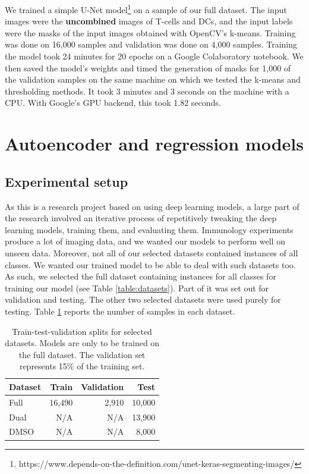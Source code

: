 We trained a simple U-Net model\footnote{https://www.depends-on-the-definition.com/unet-keras-segmenting-images/} on a sample of our full dataset. The input images were the \textbf{uncombined} images of T-cells and DCs, and the input labels were the masks of the input images obtained with OpenCV's k-means. Training was done on 16,000 samples and validation was done on 4,000 samples. Training the model took 24 minutes for 20 epochs on a Google Colaboratory notebook. We then saved the model's weights and timed the generation of masks for 1,000 of the validation samples on the same machine on which we tested the k-means and thresholding methods. It took 3 minutes and 3 seconds on the machine with a CPU. With Google's GPU backend, this took 1.82 seconds.

\section{Autoencoder and regression models}

\subsection{Experimental setup}

As this is a research project based on using deep learning models, a large part of the research involved an iterative process of repetitively tweaking the deep learning models, training them, and evaluating them. Immunology experiments produce a lot of imaging data, and we wanted our models to perform well on unseen data. Moreover, not all of our selected datasets contained instances of all classes. We wanted our trained model to be able to deal with such datasets too. As such, we selected the full dataset containing instances for all classes for training our model (see Table \ref{table:datasets}). Part of it was set out for validation and testing. The other two selected datasets were used purely for testing. Table \ref{table:splits} reports the number of samples in each dataset.

\begin{table}[h]
\centering
\caption{Train-test-validation splits for selected datasets. Models are only to be trained on the full dataset. The validation set represents 15\% of the training set.}
\begin{tabular}{|l|r|r|r|}
\hline
\rowcolor[HTML]{EFEFEF}
Dataset       & Train  & Validation & Test   \\ \hline
Full & 16,490 & 2,910      & 10,000 \\
Dual   &     N/A   &     N/A       & 13,900 \\
DMSO       &     N/A      &        N/A       & 8,000  \\ \hline
\end{tabular}
\label{table:splits}
\end{table}

